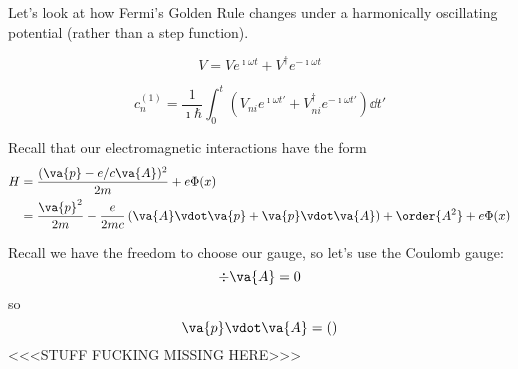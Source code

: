 \documentclass[a4paper,twoside,master.tex]{subfiles}
\begin{document}

Let's look at how Fermi's Golden Rule changes under a harmonically oscillating potential (rather than a step function).

\begin{equation}
    V = V e^{\imath \omega t} + V^\dagger e^{- \imath \omega t}
\end{equation}

\begin{equation}
    c_n^{(1)} = \frac{1}{\imath \hbar} \int_0^t \left( V_{ni} e^{\imath \omega t'} + V_{ni}^\dagger e^{- \imath \omega t'} \right) \dd{t'}
\end{equation}

Recall that our electromagnetic interactions have the form
\begin{align}
    H &= \frac{(\va{p} - e/c \va{A})^2}{2m} + e \Phi(x) \\
    &= \frac{\va{p}^2}{2m} - \frac{e}{2mc} \left( \va{A} \vdot \va{p} + \va{p} \vdot \va{A} \right) + \order{A^2} + e \Phi(x)
\end{align}

Recall we have the freedom to choose our gauge, so let's use the Coulomb gauge:
\begin{equation}
    \div{\va{A}} = 0
\end{equation}
so
\begin{equation}
    \va{p} \vdot \va{A} = ()
\end{equation}
<<<STUFF FUCKING MISSING HERE>>>
\end{document}
